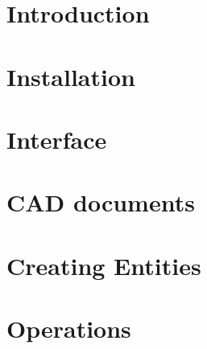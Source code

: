 \documentclass[12pt]{article}
\begin{document}
\begin{screen}
\ppttitle
\end{screen}
\footskip 0.7cm
\newpage


\newpage
\section{Introduction}

\newpage
\section{Installation}

\newpage
\section{Interface}

\newpage
\section{CAD documents}

\newpage
\section{Creating Entities}

\newpage
\section{Operations}

\end{document}
